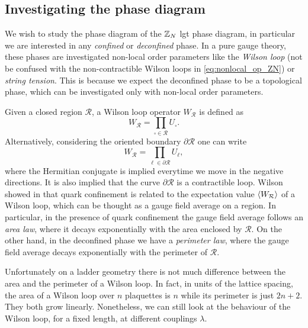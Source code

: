 \subsection{Investigating the phase diagram}%
\label{sub:investigating_the_phase_diagram}

We wish to study the phase diagram of the $\mathbb{Z}_N$ \ac{lgt} phase diagram, in particular we are interested in any \emph{confined} or \emph{deconfined} phase.
In a pure gauge theory, these phases are investigated non-local order parameters like the \emph{Wilson loop} (not be confused with the non-contractible Wilson loops in \eqref{eq:nonlocal_op_ZN}) or \emph{string tension}.
This is because we expect the deconfined phase to be a topological phase, which can be investigated only with non-local order parameters.

Given a closed region $\mathcal{R}$, a Wilson loop operator $W_{\mathcal{R}}$ is defined as
\begin{equation}
    W_{\mathcal{R}} = \prod_{\square \in \mathcal{R}} U_{\square}.
    \label{eq:closed_wilson_loop}
\end{equation}
Alternatively, considering the oriented boundary $\partial \mathcal{R}$ one can write
\begin{equation}
    W_{\mathcal{R}} = \prod_{\ell \in \partial \mathcal{R}} U_{\ell},
\end{equation}
where the Hermitian conjugate is implied everytime we move in the negative directions.
It is also implied that the curve $\partial \mathcal{R}$ is a contractible loop.
Wilson showed in \cite{wilson1974confinement} that quark confinement is related to the expectation value $\ev{W_{\mathcal{R}}}$ of a Wilson loop, which can be thought as a gauge field average on a region.
In particular, in the presence of quark confinement the gauge field average follows an \emph{area law}, where it decays exponentially with the area enclosed by $\mathcal{R}$.
On the other hand, in the deconfined phase we have a \emph{perimeter law}, where the gauge field average decays exponentially with the perimeter of $\mathcal{R}$.

Unfortunately on a ladder geometry there is not much difference between the area and the perimeter of a Wilson loop.
In fact, in units of the lattice spacing, the area of a Wilson loop over $n$ plaquettes is $n$ while its perimeter is just $2n+2$.
They both grow linearly.
Nonetheless, we can still look at the behaviour of the Wilson loop, for a fixed length, at different couplings $\lambda$.

